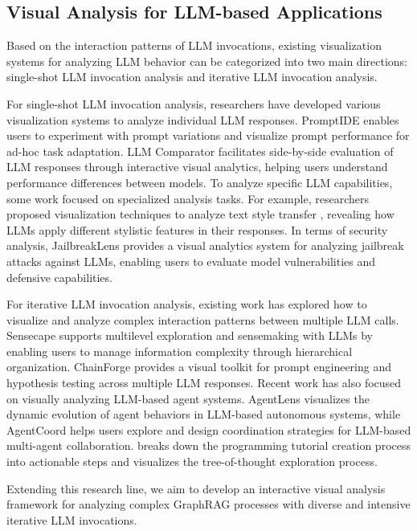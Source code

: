 \subsection{Visual Analysis for LLM-based Applications}
Based on the interaction patterns of LLM invocations, existing visualization systems for analyzing LLM behavior can be categorized into two main directions: single-shot LLM invocation analysis and iterative LLM invocation analysis.

For single-shot LLM invocation analysis, researchers have developed various visualization systems to analyze individual LLM responses. PromptIDE \cite{strobelt2022interactive} enables users to experiment with prompt variations and visualize prompt performance for ad-hoc task adaptation. LLM Comparator \cite{kahng2024llm} facilitates side-by-side evaluation of LLM responses through interactive visual analytics, helping users understand performance differences between models. To analyze specific LLM capabilities, some work focused on specialized analysis tasks. For example, researchers proposed visualization techniques to analyze text style transfer \cite{BrathVisualizingLT}, revealing how LLMs apply different stylistic features in their responses. In terms of security analysis, JailbreakLens \cite{feng2024jailbreaklens} provides a visual analytics system for analyzing jailbreak attacks against LLMs, enabling users to evaluate model vulnerabilities and defensive capabilities.

For iterative LLM invocation analysis, existing work has explored how to visualize and analyze complex interaction patterns between multiple LLM calls. Sensecape \cite{suh2023sensecape} supports multilevel exploration and sensemaking with LLMs by enabling users to manage information complexity through hierarchical organization. ChainForge \cite{arawjo2024chainforge} provides a visual toolkit for prompt engineering and hypothesis testing across multiple LLM responses. Recent work has also focused on visually analyzing LLM-based agent systems. AgentLens \cite{lu2024agentlens} visualizes the dynamic evolution of agent behaviors in LLM-based autonomous systems, while AgentCoord \cite{pan2024agentcoordvisuallyexploringcoordination} helps users explore and design coordination strategies for LLM-based multi-agent collaboration. \cite{liu2023sprout} breaks down the programming tutorial creation process into actionable steps and visualizes the tree-of-thought exploration process.

Extending this research line, we aim to develop an interactive visual analysis framework for analyzing complex GraphRAG processes with diverse and intensive iterative LLM invocations.